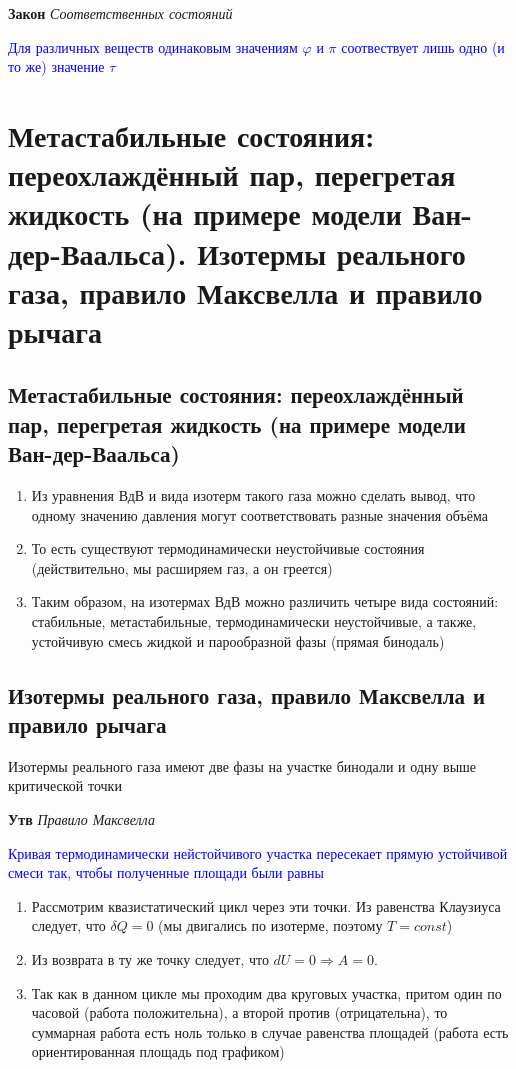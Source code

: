 \documentclass[a4paper, 14pt]{article}
\begin{document}
    \textbf{Закон} \textit{Соответственных состояний}
    
    \textcolor{blue}{Для различных веществ одинаковым значениям $\varphi$ и $\pi$ соотвествует лишь одно (и то же)
        значение $\tau$}
    
    \section{Метастабильные состояния: переохлаждённый пар, перегретая жидкость (на примере модели Ван-дер-Ваальса).
    Изотермы реального газа, правило Максвелла и правило рычага}
    
    \subsection{Метастабильные состояния: переохлаждённый пар, перегретая жидкость (на примере модели Ван-дер-Ваальса)}
    
    \begin{enumerate}
        \item Из уравнения ВдВ и вида изотерм такого газа можно сделать вывод, что одному значению давления могут
        соответствовать разные значения объёма
        \item То есть существуют термодинамически неустойчивые состояния (действительно, мы расширяем газ, а он греется)
        \item Таким образом, на изотермах ВдВ можно различить четыре вида состояний: стабильные, метастабильные,
        термодинамически неустойчивые, а также, устойчивую смесь жидкой и парообразной фазы (прямая бинодаль)
    \end{enumerate}
    
    \subsection{Изотермы реального газа, правило Максвелла и правило рычага}
    
    Изотермы реального газа имеют две фазы на участке бинодали и одну выше критической точки
    
    \textbf{Утв} \textit{Правило Максвелла}
    
    \textcolor{blue}{Кривая термодинамически нейстойчивого участка пересекает прямую устойчивой смеси так, чтобы
    полученные площади были равны}
    
    \begin{enumerate}
        \item Рассмотрим квазистатический цикл через эти точки.
        Из равенства Клаузиуса следует, что $\delta Q = 0$ (мы двигались по изотерме, поэтому $T = const$)
        \item Из возврата в ту же точку следует, что $dU = 0 \Rightarrow A = 0$.
        \item Так как в данном цикле мы проходим два круговых участка, притом один по часовой (работа положительна),
        а второй против (отрицательна), то суммарная работа есть ноль только в случае равенства площадей (работа есть
        ориентированная площадь под графиком)
    \end{enumerate}
    
\end{document}
